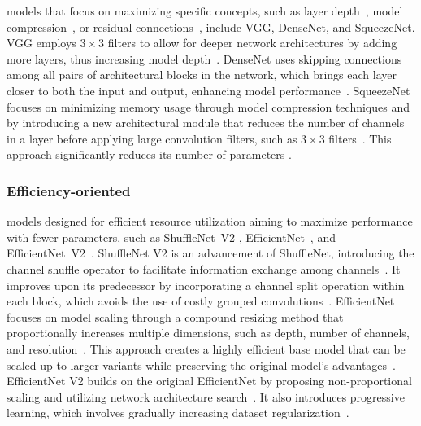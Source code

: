  models that focus on maximizing specific concepts, such as layer depth~\cite{VGG}, model compression~\cite{SqueezeNet}, or residual connections~\cite{DenseNet}, include VGG, DenseNet, and SqueezeNet. VGG employs $3\times 3$ filters to allow for deeper network architectures by adding more layers, thus increasing model depth~\cite{VGG}. DenseNet uses skipping connections among all pairs of architectural blocks in the network, which brings each layer closer to both the input and output, enhancing model performance~\cite{DenseNet}. SqueezeNet focuses on minimizing memory usage through model compression techniques and by introducing a new architectural module that reduces the number of channels in a layer before applying large convolution filters, such as $3 \times 3$ filters~\cite{SqueezeNet}. This approach significantly reduces its number of parameters .

\subsubsection{Efficiency-oriented}


 models designed for efficient resource utilization aiming to maximize performance with fewer parameters, such as ShuffleNet~V2 \cite{ShuffleNetV2}, EfficientNet~\cite{EfficientNet}, and EfficientNet~V2~\cite{EfficientNetV2}. ShuffleNet V2 is an advancement of ShuffleNet, introducing the channel shuffle operator to facilitate information exchange among channels~\cite{ShuffleNetV2}. It improves upon its predecessor by incorporating a channel split operation within each block, which avoids the use of costly grouped convolutions~\cite{ShuffleNetV2}. EfficientNet focuses on model scaling through a compound resizing method that proportionally increases multiple dimensions, such as depth, number of channels, and resolution~\cite{EfficientNet}. This approach creates a highly efficient base model that can be scaled up to larger variants while preserving the original model's advantages~\cite{EfficientNet}. EfficientNet V2 builds on the original EfficientNet by proposing non-proportional scaling and utilizing network architecture search~\cite{EfficientNetV2}. It also introduces progressive learning, which involves gradually increasing dataset regularization~\cite{EfficientNetV2}. 

